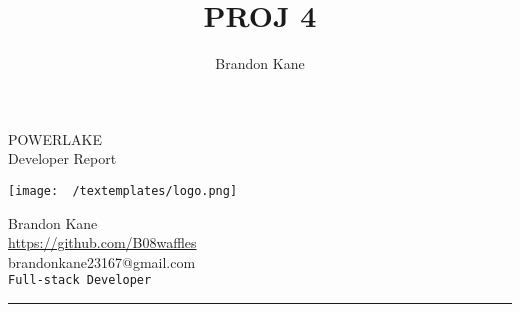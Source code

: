 \documentclass[11pt,letterpaper]{report}
\title{PROJ 4}
\author{Brandon Kane}
\begin{document}
\begin{titlepage} %


\colorbox{draculacl}{
\parbox[t]{0.93\textwidth}{ %
	\parbox[t]{0.91\textwidth}{ %
		\raggedleft %
		\fontsize{50pt}{80pt}\selectfont %
		\vspace{0.7cm} %
		POWERLAKE\\
        Developer Report\\


		\vspace{0.7cm} %
		}
	}
}

\vfill %
\begin{center}
\texttt{[image: ~/textemplates/logo.png]}
\end{center}

\parbox[t]{0.93\textwidth}{ %
	\raggedleft %

\large %
	{\Large Brandon Kane}\\[4pt] %
	\href{https://github.com/B08waffles/}{https://github.com/B08waffles}\\
	brandonkane23167@gmail.com\\[4pt] %
	\texttt{Full-stack Developer}\\

	\hfill\rule{0.2\linewidth}{1pt}%
}

\end{titlepage}
\newpage
\tableofcontents{}
\newpage
\end{document}
